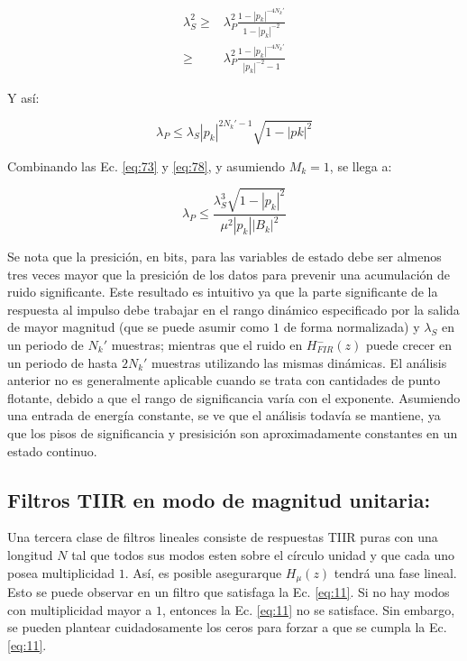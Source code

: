 \documentclass[conference]{IEEEtran}
\begin{document}
\begin{align}
    \lambda_S^2 \geq & \lambda_P^2 \frac{1-|p_k|^{-4N_k'}}{1-|p_k|^{-2}}\\
                \geq & \lambda_P^2 \frac{1-|p_k|^{-4N_k'}}{|p_k|^{-2}-1}
\end{align}

Y así:

\begin{equation}
    \lambda_P \leq \lambda_S |p_k|^{2N_k' - 1} \sqrt{1-|pk|^2}
    \label{eq:78}
\end{equation}

Combinando las Ec. \ref{eq:73} y \ref{eq:78}, y asumiendo \(M_k = 1\), se llega a:

\begin{equation}
    \lambda_P \leq \frac{\lambda_S^3 \sqrt{1-|p_k|^2}}{\mu^2 |p_k| |B_k|^2}
\end{equation}

Se nota que la presición, en bits, para las variables de estado debe ser almenos tres veces mayor que la presición de los datos para prevenir una acumulación de ruido significante. Este resultado es intuitivo ya que la parte significante de la respuesta al impulso debe trabajar en el rango dinámico especificado por la salida de mayor magnitud (que se puede asumir como \(1\) de forma normalizada) y \(\lambda_S\) en un periodo de \(N_k'\) muestras; mientras que el ruido en \(H_{FIR}^{-}(z)\) puede crecer en un periodo de hasta \(2N_k'\) muestras utilizando las mismas dinámicas. El análisis anterior no es generalmente aplicable cuando se trata con cantidades de punto flotante, debido a que el rango de significancia varía con el exponente. Asumiendo una entrada de energía constante, se ve que el análisis todavía se mantiene, ya que los pisos de significancia y presisición son aproximadamente constantes en un estado continuo.

\subsection{Filtros TIIR en modo de magnitud unitaria:}
\label{sec:org63d1f8e}

Una tercera clase de filtros lineales consiste de respuestas TIIR puras con una longitud \(N\) tal que todos sus modos esten sobre el círculo unidad y que cada uno posea multiplicidad \(1\). Así, es posible asegurarque \(H_{\mu}(z)\) tendrá una fase lineal. Esto se puede observar en un filtro que satisfaga la Ec. \ref{eq:11}. Si no hay modos con multiplicidad mayor a \(1\), entonces la Ec. \ref{eq:11} no se satisface. Sin embargo, se pueden plantear cuidadosamente los ceros para forzar a que se cumpla la Ec. \ref{eq:11}.
\end{document}
